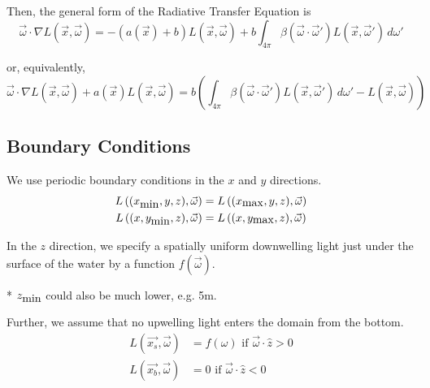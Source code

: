 Then, the general form of the Radiative Transfer Equation is
\begin{equation}
  \vec{\omega} \cdot \nabla L(\vec{x}, \vec{\omega})
  = -(a(\vec{x}) + b)L(\vec{x}, \vec{\omega})
  + b \int_{4\pi} \beta(\vec{\omega}\cdot\vec{\omega}') L(\vec{x}, \vec{\omega}')\, d\omega'
\end{equation}

or, equivalently,
\begin{equation}
  \vec{\omega} \cdot \nabla L(\vec{x}, \vec{\omega})
  + a(\vec{x})L(\vec{x}, \vec{\omega})
  = b \left(
    \int_{4\pi} \beta(\vec{\omega}\cdot\vec{\omega}') L(\vec{x}, \vec{\omega}')\, d\omega'
    - L(\vec{x}, \vec{\omega})
  \right)
\end{equation}

\subsection{Boundary Conditions}

We use periodic boundary conditions in the $x$ and $y$ directions.
\begin{align}
  L\left((x_{\mbox{min}}, y, z), \vec{\omega}\right) &= L\left((x_{\mbox{max}}, y, z), \vec{\omega}\right) \\
  L\left((x, y_{\mbox{min}}, z), \vec{\omega}\right) &= L\left((x, y_{\mbox{max}}, z), \vec{\omega}\right)
\end{align}

In the $z$ direction, we specify a spatially uniform downwelling light just
under the surface of the water by a function $f(\vec{\omega})$.

* $z_{\mbox{min}}$ could also be much lower, e.g. 5m.

Further, we assume that no upwelling light enters the domain from the bottom.
\begin{align}
  L(\vec{x_s}, \vec{\omega}) &= f(\omega) \mbox{ if } \vec{\omega} \cdot \hat{z} > 0\\ 
  L(\vec{x_b}, \vec{\omega}) &= 0 \mbox { if } \vec{\omega} \cdot \hat{z} < 0
\end{align}
 

